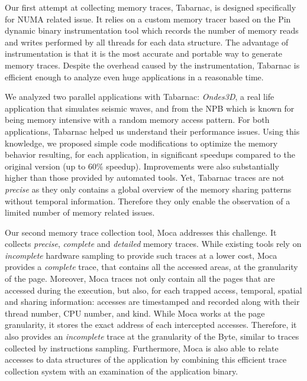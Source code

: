 Our first attempt at collecting memory traces, \gls{Tabarnac}, is designed specifically for \gls{NUMA} related issue.
It relies on a custom memory tracer based on the Pin dynamic binary instrumentation tool which records the number of memory reads and writes performed by all threads for each data structure.
The advantage of instrumentation is that it is the most accurate and portable way to generate memory traces.
Despite the overhead caused by the instrumentation, \gls{Tabarnac} is efficient enough to analyze even huge applications in a reasonable time.

We analyzed two parallel applications with \gls{Tabarnac}: \emph{Ondes3D}, a real life application that
simulates seismic waves, and \IS from the \gls{NPB} which is known for being memory intensive with a random memory access pattern.
For both applications, \gls{Tabarnac} helped us understand their performance issues.
Using this knowledge, we proposed simple code modifications to optimize the memory behavior resulting, for each application, in significant speedups compared to the original version (up to $60\%$ speedup).
Improvements were also substantially higher than those provided by automated tools.
Yet, \gls{Tabarnac} traces are not \emph{precise} as they only contains a global overview of the memory sharing patterns without temporal information.
Therefore they only enable the observation of a limited number of memory related issues.

Our second memory trace collection tool, \gls{Moca} addresses this challenge.
It  collects \emph{precise}, \emph{complete} and \emph{detailed} memory traces.
While existing tools rely on \emph{incomplete} hardware sampling to provide such traces at a lower cost, \gls{Moca} provides a \emph{complete} trace, that contains all the accessed areas, at the granularity of the page.
Moreover, \gls{Moca} traces not only contain all the pages that are accessed during the execution, but also, for each trapped access, temporal, spatial and sharing information: accesses are timestamped and recorded along with their thread number, CPU number, and kind.
While \gls{Moca} works at the page granularity, it stores the exact address of each intercepted accesses.
Therefore, it also provides an \emph{incomplete} trace at the granularity of the Byte, similar to traces collected by instructions sampling.
Furthermore, \gls{Moca} is also able to relate accesses to data structures of the application by combining this efficient trace collection system with an examination of the application binary.

